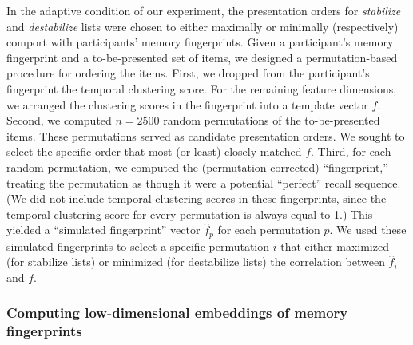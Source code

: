 \documentclass[11pt]{article}
\begin{document}
In the adaptive condition of our experiment, the presentation orders for
\textit{stabilize} and \textit{destabilize} lists were chosen to either
maximally or minimally (respectively) comport with participants' memory
fingerprints. Given a participant's memory fingerprint and a to-be-presented
set of items, we designed a permutation-based procedure for ordering the items.
First, we dropped from the participant's fingerprint the temporal clustering
score. For the remaining feature dimensions, we arranged the clustering scores
in the fingerprint into a template vector $f$. Second, we computed $n = 2500$
random permutations of the to-be-presented items. These permutations served as
candidate presentation orders. We sought to select the specific order that most
(or least) closely matched $f$. Third, for each random permutation, we computed
the (permutation-corrected) ``fingerprint,'' treating the permutation as though
it were a potential ``perfect'' recall sequence. (We did not include temporal
clustering scores in these fingerprints, since the temporal clustering score
for every permutation is always equal to 1.) This yielded a ``simulated
fingerprint'' vector $\hat{f}_p$ for each permutation $p$. We used these
simulated fingerprints to select a specific permutation $i$ that either
maximized (for stabilize lists) or minimized (for destabilize lists) the
correlation between $\hat{f}_i$ and $f$.

\subsubsection*{Computing low-dimensional embeddings of memory fingerprints}
\end{document}
